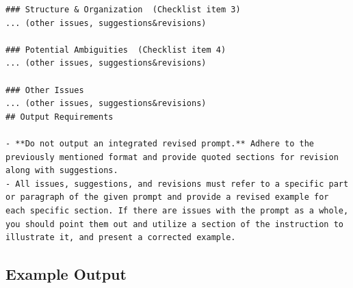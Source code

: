 \documentclass{article}
\begin{document}
\begin{verbatim}
### Structure & Organization  (Checklist item 3)
... (other issues, suggestions&revisions)

### Potential Ambiguities  (Checklist item 4)
... (other issues, suggestions&revisions)

### Other Issues
... (other issues, suggestions&revisions)
## Output Requirements

- **Do not output an integrated revised prompt.** Adhere to the previously mentioned format and provide quoted sections for revision along with suggestions. 
- All issues, suggestions, and revisions must refer to a specific part or paragraph of the given prompt and provide a revised example for each specific section. If there are issues with the prompt as a whole, you should point them out and utilize a section of the instruction to illustrate it, and present a corrected example.

\end{verbatim}
\subsection{Example Output}
\end{document}
